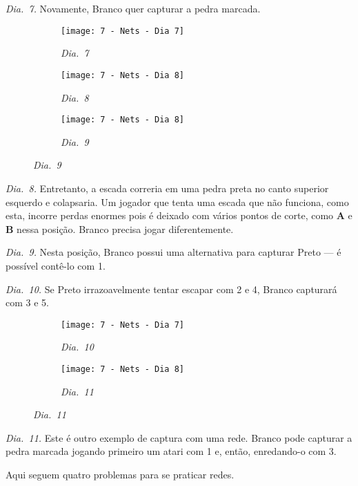 \emph{Dia.\@~7.} Novamente, Branco quer capturar a pedra marcada.

\begin{figure}[h!]
    \centering
    \begin{subfigure}[t]{.31\textwidth}
        \texttt{[image: 7 - Nets - Dia 7]}
        \caption*{\emph{Dia.\@~7}}
    \end{subfigure}
    \hfill
    \begin{subfigure}[t]{.31\textwidth}
        \texttt{[image: 7 - Nets - Dia 8]}
        \caption*{\emph{Dia.\@~8}}
    \end{subfigure}
    \hfill
    \begin{subfigure}[t]{.31\textwidth}
        \texttt{[image: 7 - Nets - Dia 8]}
        \caption*{\emph{Dia.\@~9}}
    \end{subfigure}
\end{figure}

\emph{Dia.\@~8.} Entretanto, a escada correria em uma pedra preta no canto superior esquerdo e colapsaria. Um jogador que tenta uma escada que não funciona, como esta, incorre perdas enormes pois é deixado com vários pontos de corte, como \textbf{A} e \textbf{B} nessa posição. Branco precisa jogar diferentemente.

\emph{Dia.\@~9.} Nesta posição, Branco possui uma alternativa para capturar Preto --- é possível contê-lo com 1.

\emph{Dia.\@~10.} Se Preto irrazoavelmente tentar escapar com 2 e 4, Branco capturará com 3 e 5.

\begin{figure}[h!]
    \centering
    \begin{subfigure}[t]{.31\textwidth}
        \texttt{[image: 7 - Nets - Dia 7]}
        \caption*{\emph{Dia.\@~10}}
    \end{subfigure}
    \hspace{1cm}
    \begin{subfigure}[t]{.31\textwidth}
        \texttt{[image: 7 - Nets - Dia 8]}
        \caption*{\emph{Dia.\@~11}}
    \end{subfigure}
\end{figure}

\emph{Dia.\@~11.} Este é outro exemplo de captura com uma rede. Branco pode capturar a pedra marcada jogando primeiro um atari com 1 e, então, enredando-o com 3.

Aqui seguem quatro problemas para se praticar redes.

